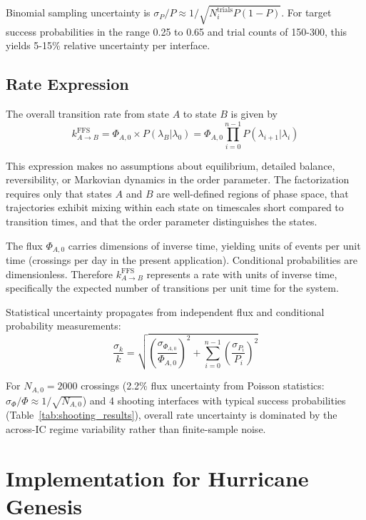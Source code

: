 \documentclass[11pt]{article}
\begin{document}
Binomial sampling uncertainty is $\sigma_P/P \approx 1/\sqrt{N_i^{\text{trials}} P(1-P)}$. For target success probabilities in the range 0.25 to 0.65 and trial counts of 150-300, this yields 5-15\% relative uncertainty per interface.

\subsection{Rate Expression}

The overall transition rate from state $A$ to state $B$ is given by
\begin{equation}\label{eq:ffs_rate}
k_{A \to B}^{\text{FFS}} = \Phi_{A,0} \times P(\lambda_B | \lambda_0) = \Phi_{A,0} \prod_{i=0}^{n-1} P(\lambda_{i+1} | \lambda_i)
\end{equation}

This expression makes no assumptions about equilibrium, detailed balance, reversibility, or Markovian dynamics in the order parameter. The factorization requires only that states $A$ and $B$ are well-defined regions of phase space, that trajectories exhibit mixing within each state on timescales short compared to transition times, and that the order parameter distinguishes the states.

The flux $\Phi_{A,0}$ carries dimensions of inverse time, yielding units of events per unit time (crossings per day in the present application). Conditional probabilities are dimensionless. Therefore $k_{A \to B}^{\text{FFS}}$ represents a rate with units of inverse time, specifically the expected number of transitions per unit time for the system.

Statistical uncertainty propagates from independent flux and conditional probability measurements:
\begin{equation}
\frac{\sigma_k}{k} = \sqrt{\left(\frac{\sigma_{\Phi_{A,0}}}{\Phi_{A,0}}\right)^2 + \sum_{i=0}^{n-1} \left(\frac{\sigma_{P_i}}{P_i}\right)^2}
\end{equation}

For $N_{A,0} = 2000$ crossings (2.2\% flux uncertainty from Poisson statistics: $\sigma_{\Phi}/\Phi \approx 1/\sqrt{N_{A,0}}$) and 4 shooting interfaces with typical success probabilities (Table~\ref{tab:shooting_results}), overall rate uncertainty is dominated by the across-IC regime variability rather than finite-sample noise.
\section{Implementation for Hurricane Genesis}
\label{sec:implementation}
\end{document}
